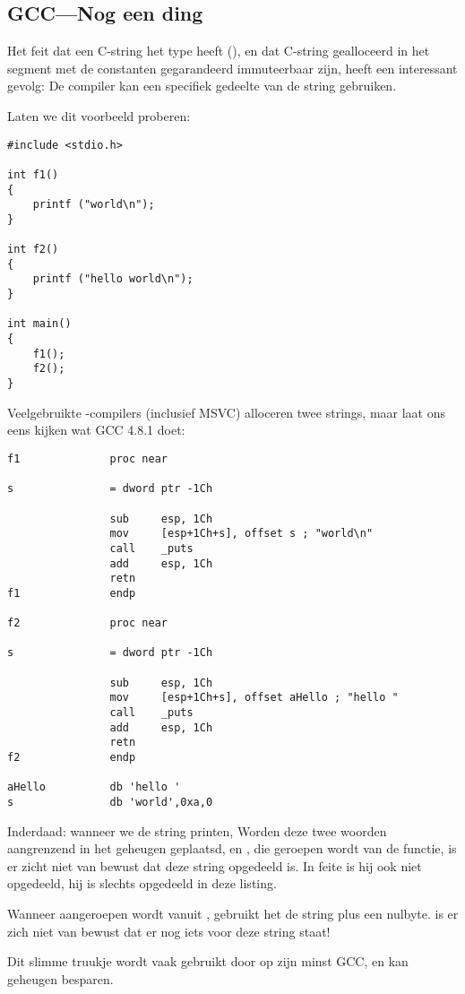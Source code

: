 \subsection{GCC---Nog een ding}
\label{use_parts_of_C_strings}

Het feit dat een  C-string het type  heeft (), 
en dat C-string gealloceerd in het segment met de constanten gegarandeerd immuteerbaar zijn, heeft een interessant gevolg:
De compiler kan een specifiek gedeelte van de string gebruiken.

Laten we dit voorbeeld proberen:

\begin{lstlisting}[style=customc]
#include <stdio.h>

int f1()
{
	printf ("world\n");
}

int f2()
{
	printf ("hello world\n");
}

int main()
{
	f1();
	f2();
}
\end{lstlisting}

Veelgebruikte \CCpp{}-compilers (inclusief MSVC) alloceren twee strings, maar laat ons eens kijken wat GCC 4.8.1 doet:

\begin{lstlisting}[caption=GCC 4.8.1 + IDA,style=customasmx86]
f1              proc near

s               = dword ptr -1Ch

                sub     esp, 1Ch
                mov     [esp+1Ch+s], offset s ; "world\n"
                call    _puts
                add     esp, 1Ch
                retn
f1              endp

f2              proc near

s               = dword ptr -1Ch

                sub     esp, 1Ch
                mov     [esp+1Ch+s], offset aHello ; "hello "
                call    _puts
                add     esp, 1Ch
                retn
f2              endp

aHello          db 'hello '
s               db 'world',0xa,0
\end{lstlisting}

Inderdaad: wanneer we de  string printen, 
Worden deze twee woorden aangrenzend in het geheugen geplaatsd, en \puts, die geroepen wordt van de 
functie, is er zicht niet van bewust dat deze string opgedeeld is. 
In feite is hij ook niet opgedeeld, hij is slechts  opgedeeld in deze listing.

Wanneer \puts aangeroepen wordt vanuit , gebruikt het de  string plus een nulbyte. \puts is er zich niet van bewust dat er nog iets voor deze string staat!

Dit slimme truukje wordt vaak gebruikt door op zijn minst GCC, en kan geheugen besparen.

